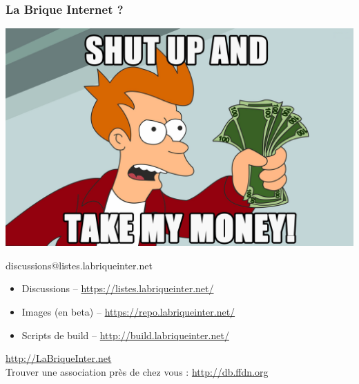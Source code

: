 \documentclass[notes=hide]{beamer}
\begin{document}
\begin{frame}[t]
\frametitle{\textcolor{titre}{La Brique Internet ?}}
\begin{center}
\vfill
\includegraphics[width=.6\textwidth]{img2/Shut-up-and-take-my-money.jpg}
\vfill
\end{center}
\end{frame}

\begin{frame}[t]
  \begin{center}
  \vfill
  \vspace{.5cm}
  {\Huge discussions@listes.labriqueinter.net}
  \vspace{1.5cm}
  \begin{itemize}
    \item Discussions -- \url{https://listes.labriqueinter.net/}
    \item Images (en beta) -- \url{https://repo.labriqueinter.net/}
    \item Scripts de build -- \url{http://build.labriqueinter.net/}
  \end{itemize}
  \end{center}
\end{frame}


\begin{frame}[t]{}
\begin{center}
\vfill
\vspace{.5cm}
{\Huge \url{http://LaBriqueInter.net}}
\vspace{1.5cm}
\\ Trouver une association près de chez vous :
\vspace{.5cm}
{\Large \url{http://db.ffdn.org}}
\vfill
\end{center}
\end{frame}
\end{document}
